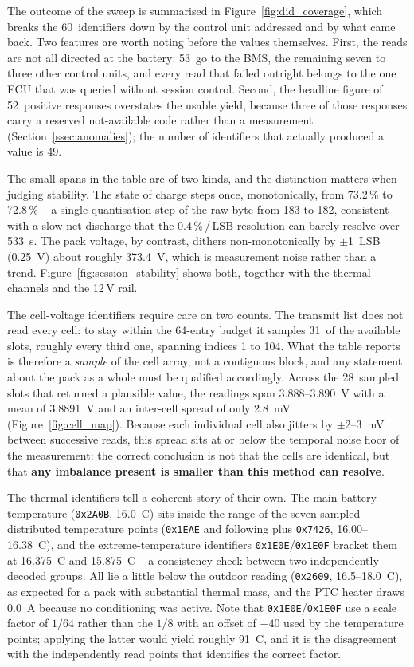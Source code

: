 \documentclass[11pt,a4paper,oneside,parskip=half]{scrreprt}
\providecommand{\hex}{}\renewcommand{\hex}[1]{\texttt{0x#1}}
\begin{document}
The outcome of the sweep is summarised in Figure~\ref{fig:did_coverage}, which breaks the 60~identifiers down by the control unit addressed and by what came back. Two features are worth noting before the values themselves. First, the reads are not all directed at the battery: 53~go to the BMS, the remaining seven to three other control units, and every read that failed outright belongs to the one ECU that was queried without session control. Second, the headline figure of 52~positive responses overstates the usable yield, because three of those responses carry a reserved not-available code rather than a measurement (Section~\ref{ssec:anomalies}); the number of identifiers that actually produced a value is 49.

The small spans in the table are of two kinds, and the distinction matters when judging stability. The state of charge steps once, monotonically, from 73.2\,\% to 72.8\,\% -- a single quantisation step of the raw byte from 183 to 182, consistent with a slow net discharge that the 0.4\,\%\,/\,LSB resolution can barely resolve over 533~s. The pack voltage, by contrast, dithers non-monotonically by $\pm$1~LSB (0.25~V) about roughly 373.4~V, which is measurement noise rather than a trend. Figure~\ref{fig:session_stability} shows both, together with the thermal channels and the 12\,V rail.

The cell-voltage identifiers require care on two counts. The transmit list does not read every cell: to stay within the 64-entry budget it samples 31~of the available slots, roughly every third one, spanning indices 1 to 104. What the table reports is therefore a \emph{sample} of the cell array, not a contiguous block, and any statement about the pack as a whole must be qualified accordingly. Across the 28~sampled slots that returned a plausible value, the readings span 3.888--3.890~V with a mean of 3.8891~V and an inter-cell spread of only 2.8~mV (Figure~\ref{fig:cell_map}). Because each individual cell also jitters by $\pm$2--3~mV between successive reads, this spread sits at or below the temporal noise floor of the measurement: the correct conclusion is not that the cells are identical, but that \textbf{any imbalance present is smaller than this method can resolve}.

The thermal identifiers tell a coherent story of their own. The main battery temperature (\hex{2A0B}, 16.0~\textdegree C) sits inside the range of the seven sampled distributed temperature points (\hex{1EAE} and following plus \hex{7426}, 16.00--16.38~\textdegree C), and the extreme-temperature identifiers \hex{1E0E}/\hex{1E0F} bracket them at 16.375~\textdegree C and 15.875~\textdegree C -- a consistency check between two independently decoded groups. All lie a little below the outdoor reading (\hex{2609}, 16.5--18.0~\textdegree C), as expected for a pack with substantial thermal mass, and the PTC heater draws 0.0~A because no conditioning was active. Note that \hex{1E0E}/\hex{1E0F} use a scale factor of $1/64$ rather than the $1/8$ with an offset of $-40$ used by the temperature points; applying the latter would yield roughly 91~\textdegree C, and it is the disagreement with the independently read points that identifies the correct factor.
\end{document}
